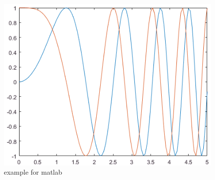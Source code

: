 \begin{figure}

\includegraphics[scale=0.5]{def}
\caption{example for matlab}
\end{figure}



%
%






